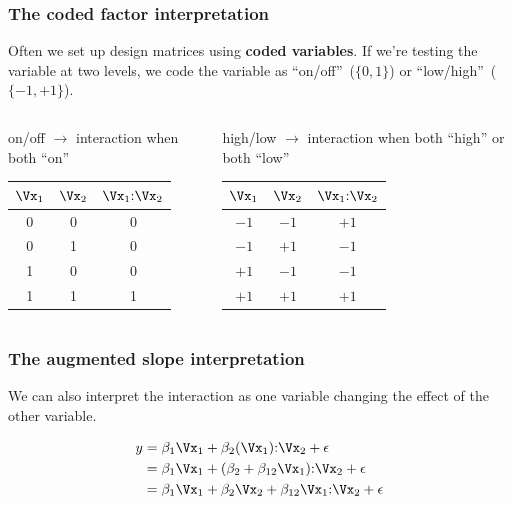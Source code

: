 \documentclass{beamer}
\begin{document}
\begin{frame}
\frametitle{The coded factor interpretation}

Often we set up design matrices using \textbf{coded variables}. If we're testing the variable at two levels, we code the variable as ``on/off''~($\{0,1\}$) or ``low/high''~($\{-1,+1\}$).

\pause
\bigskip
\begin{columns}
\begin{column}{0.55\textwidth}
on/off $\rightarrow$ interaction when both ``on''
\begin{center}
\begin{tabular}{cc|c}
	$\Vx_1$ & $\Vx_2$ & $\Vx_1\mathcolon \Vx_2$ \\
	\hline
	0 & 0 & 0 \\
	0 & 1 & 0 \\
	1 & 0 & 0 \\
	1 & 1 & 1
\end{tabular}
\end{center}
\end{column}

\pause
\begin{column}{0.5\textwidth}
high/low $\rightarrow$ interaction when both ``high'' or both ``low''
\begin{center}
\begin{tabular}{cc|c}
	$\Vx_1$ & $\Vx_2$ & $\Vx_1\mathcolon \Vx_2$ \\
	\hline
	$-1$ & $-1$ & $+1$ \\
	$-1$ & $+1$ & $-1$ \\
	$+1$ & $-1$ & $-1$ \\
	$+1$ & $+1$ & $+1$
\end{tabular}
\end{center}
\end{column}
\end{columns}

\end{frame}

\begin{frame}
\frametitle{The augmented slope interpretation}

We can also interpret the interaction as one variable changing the effect of the other variable.

\begin{align*}
	y &= \beta_1\Vx_1 + \beta_2(\Vx_1)\mathcolon\Vx_2 + \epsilon \\
	 &= \beta_1\Vx_1 + (\beta_2 + \beta_{12}\Vx_1)\mathcolon \Vx_2 + \epsilon \\
	 &= \beta_1\Vx_1 + \beta_2\Vx_2 + \beta_{12}\Vx_1\mathcolon \Vx_2 + \epsilon
\end{align*}
\end{frame}
\end{document}
